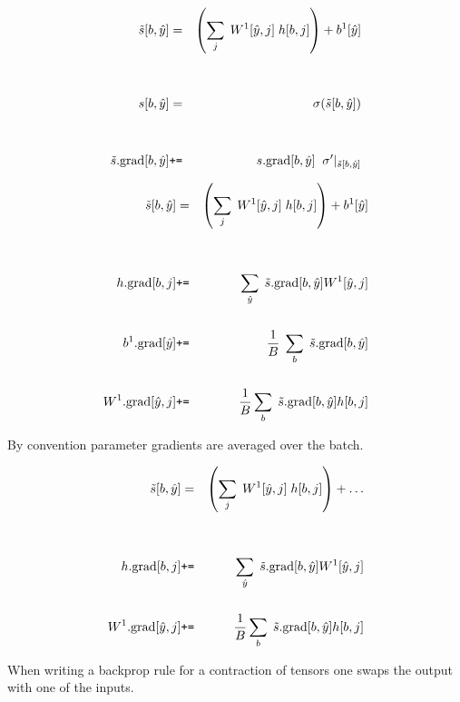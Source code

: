 {

\begin{eqnarray*}
  \tilde{s}[b,\hat{y}] & = & \left(\sum_j\;W^1[\hat{y},j]\;h[b,j]\right) + b^1[\hat{y}] \\
  \\
  \\
  s[b,\hat{y}] & = & \sigma(\tilde{s}[b,\hat{y}]) \\
  \\
  \\
  \tilde{s}.\mathrm{grad}[b,\hat{y}] & \mbox{\tt +=} & s.\mathrm{grad}[b,\hat{y}]\;\; \sigma'|_{\tilde{s}[b,\hat{y}]}
\end{eqnarray*}

\vspace{-3ex}
\begin{eqnarray*}
  \tilde{s}[b,\hat{y}] & = & \left(\sum_j\;W^1[\hat{y},j]\;h[b,j]\right) + b^1[\hat{y}] \\
  \\
  \\
  h.\mathrm{grad}[b,j] & \mbox{\tt +=} & \sum_{\hat{y}}\;\tilde{s}.\mathrm{grad}[b,\hat{y}]W^1[\hat{y},j] \\
  \\
  b^1.\mathrm{grad}[\hat{y}] & \mbox{\tt +=} & \frac{1}{B}\;\sum_b \;\tilde{s}.\mathrm{grad}[b,\hat{y}] \\
  \\
  W^1.\mathrm{grad}[\hat{y},j] & \mbox{\tt +=} & \frac{1}{B} \sum_b\;\tilde{s}.\mathrm{grad}[b,\hat{y}]h[b,j]
\end{eqnarray*}

By convention parameter gradients are averaged over the batch.

\vspace{-3ex}
\begin{eqnarray*}
  \tilde{s}[b,\hat{y}] & = & \left(\sum_j\;W^1[\hat{y},j]\;h[b,j]\right) + \ldots \\
  \\
  \\
  h.\mathrm{grad}[b,j] & \mbox{\tt +=} & \sum_{\hat{y}}\;\tilde{s}.\mathrm{grad}[b,\hat{y}]W^1[\hat{y},j] \\
  \\
  W^1.\mathrm{grad}[\hat{y},j] & \mbox{\tt +=} & \frac{1}{B} \sum_b\;\tilde{s}.\mathrm{grad}[b,\hat{y}]h[b,j]
\end{eqnarray*}

When writing a backprop rule for a contraction of tensors one swaps the output with one of the inputs.

}

